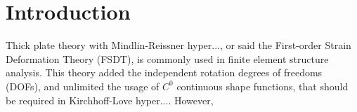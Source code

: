 \section{Introduction}

Thick plate theory with Mindlin-Reissner hyper..., or said the First-order Strain Deformation Theory (FSDT), is commonly used in finite element structure analysis.
This theory added the independent rotation degrees of freedoms (DOFs), and unlimited the usage of $C^0$ continuous shape functions, that should be required in Kirchhoff-Love hyper....
However, 